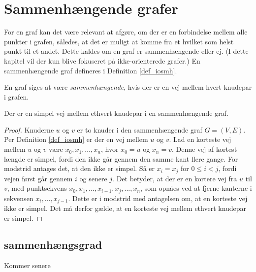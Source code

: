 \section{Sammenhængende grafer}
For en graf kan det være relevant at afgøre, om der er en forbindelse mellem alle punkter i grafen, således, at det er muligt at komme fra et hvilket som helst punkt til et andet. Dette kaldes om en graf er sammenhængende eller ej.
(I dette kapitel vil der kun blive fokuseret på ikke-orienterede grafer.)
En sammenhængende graf defineres i Definition \ref{def_iosmh}.

\begin{defn}
\label{def_iosmh}
En graf siges at være \textit{sammenhængende}, hvis der er en vej mellem hvert knudepar i grafen. 
\end{defn}


\begin{thm}
Der er en simpel vej mellem ethvert knudepar i en sammenhængende graf.
\label{smh_satning}
\end{thm}

\begin{proof}
Knuderne $u$ og $v$ er to knuder i den sammenhængende graf $G=(V,E)$.
Per Definition \ref{def_iosmh} er der en vej mellem $u$ og $v$.
Lad en korteste vej mellem $u$ og $v$ være $x_0,x_1,...,x_n$, hvor $x_0=u$ og $x_n=v$.
Denne vej af kortest længde er simpel, fordi den ikke går gennem den samme kant flere gange. 
For modstrid antages det, at den ikke er simpel. 
Så er $x_i=x_j$ for $0 \leq i < j$, fordi vejen først går gennem $i$ og senere $j$.
Det betyder, at der er en kortere vej fra $u$ til $v$, med punktsekvens $x_0,x_1,...,x_{i-1},x_j,...,x_n$, som opnåes ved at fjerne kanterne i sekvensen $x_i,...,x_{j-1}$.
Dette er i modstrid med antagelsen om, at en korteste vej ikke er simpel.
Det må derfor gælde, at en korteste vej mellem ethvert knudepar er simpel. 
\end{proof}

\subsection{sammenhængsgrad}
Kommer senere

